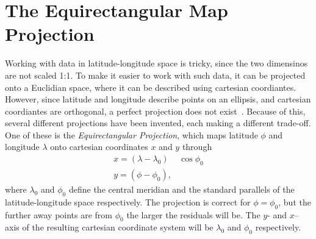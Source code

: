 \section{The Equirectangular Map Projection}
Working with data in latitude-longitude space is tricky, since the two
dimensinos are not scaled 1:1. To make it easier to work with such
data, it can be projected onto a Euclidian space, where it can be
described using cartesian coordiantes. However, since latitude and
longitude describe points on an ellipsis, and cartesian coordiantes are
orthogonal, a perfect projection does not
exist~\cite{snyder1989album}. Because of this, several different
projections have been invented, each making a different trade-off.
One of these is the \textit{Equirectangular Projection}, which maps
latitude $\phi$ and longitude $\lambda$ onto cartesian coordinates $x$
and $y$ through
\begin{equation}
  \label{eq:equirectangular-projection}
  \begin{split}
    x = (\lambda - \lambda_0)&
    \cos \phi_0 \\
    y = (\phi - \phi_0),
  \end{split}
\end{equation}
where $\lambda_0$ and $\phi_0$ define the
central meridian and the standard parallels of the latitude-longitude
space respectively. The projection is
correct for $\phi = \phi_0$, but the further away points are from
$\phi_0$ the larger the residuals will be. The $y$- and $x$--axis of
the resulting cartesian coordinate system will be $\lambda_0$ and
$\phi_0$ respectively.
